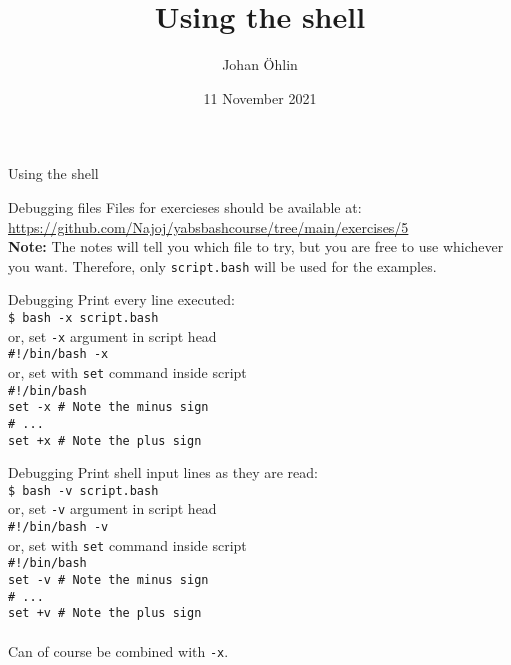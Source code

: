 \documentclass{beamer}
\title{Using the shell}
\date{11 November 2021}
\author{Johan Öhlin}
\institute{Yabs}
\let\tt\texttt
\let\bf\textbf
\begin{document}
\begin{frame}{Using the shell}
\maketitle
\end{frame}

\begin{frame}{Debugging files}
    Files for exercieses should be available at:    \\
    \url{https://github.com/Najoj/yabsbashcourse/tree/main/exercises/5} \\
    \bf{Note:} The notes will tell you which file to try, but you are free to use whichever you want. Therefore, only \tt{script.bash} will be used for the examples.
\end{frame}

\begin{frame}{Debugging}
    Print every line executed:      \\
    \tt{\$ bash -x script.bash}     \\
    or, set \tt{-x} argument in script head \\
    \tt{\#!/bin/bash -x}            \\
    or, set with \tt{set} command inside script \\
    \tt{\#!/bin/bash}               \\
    \tt{set -x  \# Note the minus sign} \\
    \tt{\# ...}                         \\
    \tt{set +x  \# Note the plus sign}  \\
\end{frame}

\begin{frame}{Debugging}
    Print shell input lines as they are read:   \\
    \tt{\$ bash -v script.bash}     \\
    or, set \tt{-v} argument in script head \\
    \tt{\#!/bin/bash -v}            \\
    or, set with \tt{set} command inside script \\
    \tt{\#!/bin/bash}               \\
    \tt{set -v  \# Note the minus sign}  \\
    \tt{\# ...}                          \\
    \tt{set +v  \# Note the plus sign}   \\
    \quad                           \\
    Can of course be combined with \tt{-x}.
\end{frame}
\end{document}
